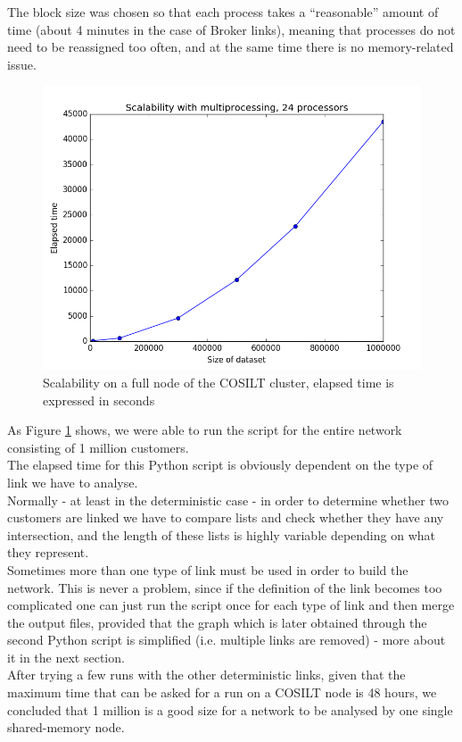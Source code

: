 \documentclass[a4paper,11pt]{book}
\begin{document}
The block size was chosen so that each process takes a ``reasonable'' amount of time (about 4 minutes in the case of Broker links), meaning that processes do not need to be reassigned too often, and at the same time there is no memory-related issue.

\begin{figure}[H]
\centering
\includegraphics[height=7.0 cm,width=10 cm]{24cores_shared.png}
\caption{Scalability on a full node of the COSILT cluster, elapsed time is expressed in seconds}\label{fig:shared}
\end{figure}
As Figure \ref{fig:shared} shows, we were able to run the script for the entire network consisting of 1 million customers.\\

The elapsed time for this Python script is obviously dependent on the type of link we have to analyse.\\
Normally - at least in the deterministic case - in order to determine whether two customers are linked we have to compare lists and check whether they have any intersection, and the length of these lists is highly variable depending on what they represent.\\

Sometimes more than one type of link must be used in order to build the network. This is never a problem, since if the definition of the link becomes too complicated one can just run the script once for each type of link and then merge the output files, provided that the graph which is later obtained through the second Python script is simplified (i.e. multiple links are removed) - more about it in the next section.\\

After trying a few runs with the other deterministic links, given that the maximum time that can be asked for a run on a COSILT node is 48 hours, we concluded that 1 million is a good size for a network to be analysed by one single shared-memory node.
\end{document}
